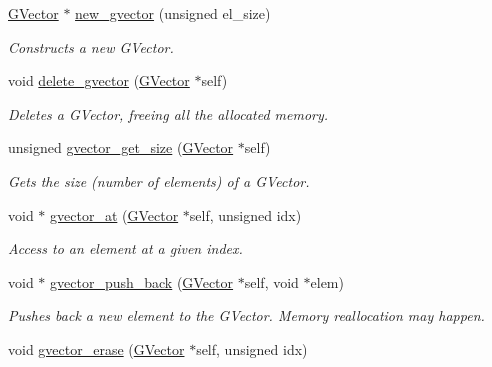 \begin{DoxyCompactItemize}
\item 
\hyperlink{group___g_vector_ga6d90d5e6b721779a43354f2752b79281}{G\+Vector} $\ast$ \hyperlink{group___g_vector_gae4381c0ccdbebaa240e06595e59c5712}{new\+\_\+gvector} (unsigned el\+\_\+size)
\begin{DoxyCompactList}\small\item\em Constructs a new G\+Vector. \end{DoxyCompactList}\item 
void \hyperlink{group___g_vector_gab3513aa2ddf9e3016d4be27fff810b39}{delete\+\_\+gvector} (\hyperlink{group___g_vector_ga6d90d5e6b721779a43354f2752b79281}{G\+Vector} $\ast$self)
\begin{DoxyCompactList}\small\item\em Deletes a G\+Vector, freeing all the allocated memory. \end{DoxyCompactList}\item 
unsigned \hyperlink{group___g_vector_ga3570990e6e22e8bd76cceec25869e117}{gvector\+\_\+get\+\_\+size} (\hyperlink{group___g_vector_ga6d90d5e6b721779a43354f2752b79281}{G\+Vector} $\ast$self)
\begin{DoxyCompactList}\small\item\em Gets the size (number of elements) of a G\+Vector. \end{DoxyCompactList}\item 
void $\ast$ \hyperlink{group___g_vector_ga01efe5e5a35c4656de07aa3b1c937b0b}{gvector\+\_\+at} (\hyperlink{group___g_vector_ga6d90d5e6b721779a43354f2752b79281}{G\+Vector} $\ast$self, unsigned idx)
\begin{DoxyCompactList}\small\item\em Access to an element at a given index. \end{DoxyCompactList}\item 
void $\ast$ \hyperlink{group___g_vector_ga638f666cc999e6b840302ca1de552b85}{gvector\+\_\+push\+\_\+back} (\hyperlink{group___g_vector_ga6d90d5e6b721779a43354f2752b79281}{G\+Vector} $\ast$self, void $\ast$elem)
\begin{DoxyCompactList}\small\item\em Pushes back a new element to the G\+Vector. Memory reallocation may happen. \end{DoxyCompactList}\item 
void \hyperlink{group___g_vector_ga7efdee3a454559bde23b23f31d40b4db}{gvector\+\_\+erase} (\hyperlink{group___g_vector_ga6d90d5e6b721779a43354f2752b79281}{G\+Vector} $\ast$self, unsigned idx)

\end{DoxyCompactItemize}
